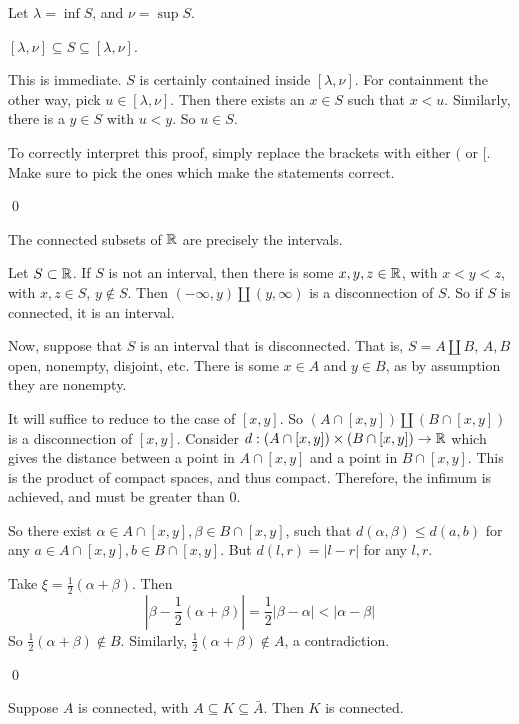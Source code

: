 \documentclass[x11names,reqno,14pt]{extarticle}
\newcommand*{\oo}{{\infty}}
\begin{document}
Let $\lambda = \inf S$, and $\nu = \sup S$. 

\claim

$[\lambda, \nu] \subseteq S \subseteq [\lambda, \nu]$. 

\proof

This is immediate. $S$ is certainly contained inside $[\lambda, \nu]$. For containment the other way, pick $u \in [\lambda, \nu]$. Then there exists an $x \in S$ such that $x < u$. Similarly, there is a $y \in S$ with $u < y$. So $u \in S$. 

To correctly interpret this proof, simply replace the brackets with either $($ or $[$. Make sure to pick the ones which make the statements correct. 

\qed

\thm

The connected subsets of $\mathbb{R}$ are precisely the intervals. 

\proof

Let $S \subset \mathbb{R}$. If $S$ is not an interval, then there is some $x, y, z \in \mathbb{R}$, with $x < y < z$, with $x, z \in S$,  $y \not\in S$. Then $(-\oo, y) \coprod (y, \oo)$ is a disconnection of $S$. So if $S$ is connected, it is an interval. 

Now, suppose that $S$ is an interval that is disconnected. That is, $S = A \coprod B$, $A, B$ open, nonempty, disjoint, etc. There is some $x \in A$ and $y \in B$, as by assumption they are nonempty. 

It will suffice to reduce to the case of $[x, y]$. So $(A \cap [x, y]) \coprod (B \cap [x, y])$ is a disconnection of $[x, y]$. Consider $d:(A\cap[x, y])\times(B\cap[x, y])\to \mathbb{R}$ which gives the distance between a point in $A \cap [x, y]$ and a point in $B \cap [x, y]$. This is the product of compact spaces, and thus compact. Therefore, the infimum is achieved, and must be greater than $0$. 

So there exist $\alpha \in A\cap[x, y], \beta \in B\cap[x, y]$, such that $d(\alpha,\beta) \leq d(a, b)$ for any $a \in A\cap[x, y], b \in B\cap[x,y]$. But $d(l, r) = |l - r|$ for any $l, r$. 

Take $\xi = \frac{1}{2}(\alpha + \beta)$. Then
\[
|\beta - \frac{1}{2}(\alpha + \beta)| = \frac{1}{2}|\beta - \alpha| < |\alpha - \beta|
\]
So $\frac{1}{2}(\alpha + \beta)\not\in B$. Similarly, $\frac{1}{2}(\alpha + \beta) \not\in A$, a contradiction. 

\qed

\thm

Suppose $A$ is connected, with $A \subseteq K \subseteq\bar{A}$. Then $K$ is connected. 
\end{document}
